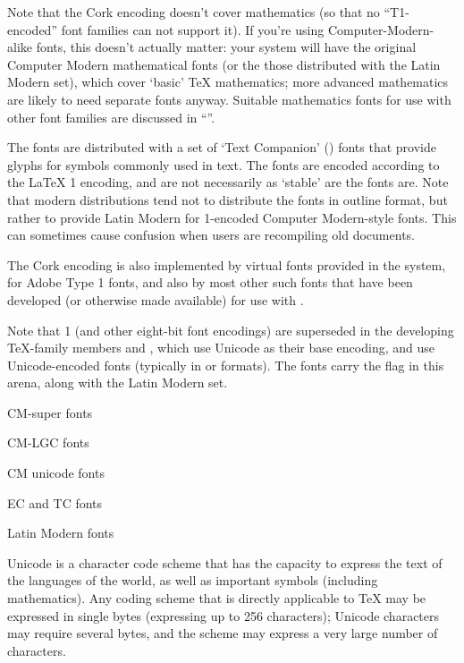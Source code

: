 Note that the Cork encoding doesn't cover mathematics (so that no
``T1-encoded'' font families can not support it).  If you're using
Computer-Modern-alike fonts, this doesn't actually matter: your system
will have the original Computer Modern mathematical fonts (or the
those distributed with the Latin Modern set), which cover `basic' \TeX{}
mathematics; more advanced mathematics are likely to need separate
fonts anyway.  Suitable mathematics fonts for use with other font
families are discussed in %
``''.

The  fonts are distributed with a set of `Text Companion' () fonts
that provide glyphs for symbols commonly used in text. The  fonts
are encoded according to the \LaTeX{} 1 encoding, and are not
necessarily as `stable' are the  fonts are.  Note that modern
distributions tend not to distribute the  fonts in outline format, but
rather to provide Latin Modern for 1-encoded Computer Modern-style
fonts.  This can sometimes cause confusion when users are recompiling
old documents.

The Cork encoding is also implemented by virtual fonts provided in the
 system, for Adobe Type 1 fonts, and also by most other such
fonts that have been developed (or otherwise made available) for use
with \alltex{}. 

Note that 1 (and other eight-bit font encodings) are superseded in
the developing \TeX{}-family members  and
, which use Unicode as their base encoding,
and use Unicode-encoded fonts (typically in  or
 formats).  The  fonts carry the
flag in this arena, along with the Latin Modern set.
\begin{ctanrefs}
\item[CM-super fonts]
\item[CM-LGC fonts]
\item[CM unicode fonts]
\item[EC and TC fonts]
\item[Latin Modern fonts]
\end{ctanrefs}


Unicode is a character code scheme that has the capacity to express
the text of the languages of the world, as well as important symbols
(including mathematics).  Any coding scheme that is directly
applicable to \TeX{} may be expressed in single bytes (expressing up
to 256 characters); Unicode characters may require several bytes, and
the scheme may express a very large number of characters.

